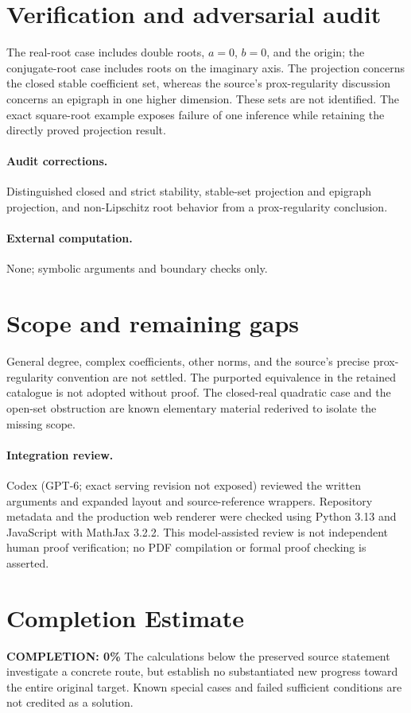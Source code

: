 \documentclass[11pt]{article}
\begin{document}
\section{Verification and adversarial audit}
The real-root case includes double roots, $a=0$, $b=0$, and the origin; the conjugate-root case includes roots on the imaginary axis. The projection concerns the closed stable coefficient set, whereas the source's prox-regularity discussion concerns an epigraph in one higher dimension. These sets are not identified. The exact square-root example exposes failure of one inference while retaining the directly proved projection result.
\paragraph{Audit corrections.} Distinguished closed and strict stability, stable-set projection and epigraph projection, and non-Lipschitz root behavior from a prox-regularity conclusion.
\paragraph{External computation.} None; symbolic arguments and boundary checks only.
\section{Scope and remaining gaps}
General degree, complex coefficients, other norms, and the source's precise prox-regularity convention are not settled. The purported equivalence in the retained catalogue is not adopted without proof. The closed-real quadratic case and the open-set obstruction are known elementary material rederived to isolate the missing scope.
\paragraph{Integration review.} Codex (GPT-6; exact serving revision not exposed) reviewed the written arguments and expanded layout and source-reference wrappers. Repository metadata and the production web renderer were checked using Python 3.13 and JavaScript with MathJax 3.2.2. This model-assisted review is not independent human proof verification; no PDF compilation or formal proof checking is asserted.

\section{Completion Estimate}
\noindent\textbf{COMPLETION: 0\%}
The calculations below the preserved source statement investigate a concrete route,
but establish no substantiated new progress toward the entire original target.
Known special cases and failed sufficient conditions are not credited as a solution.
\end{document}
